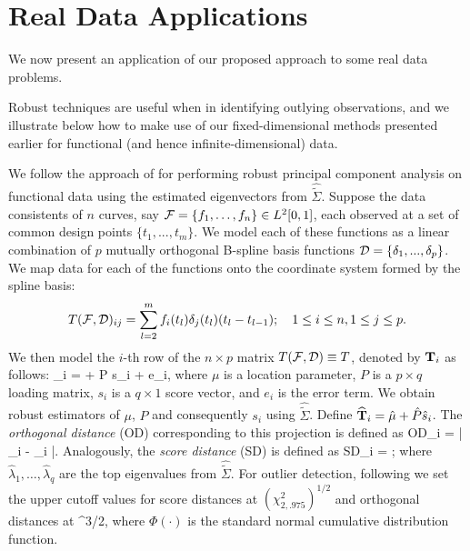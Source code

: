 \section{Real Data Applications}
\label{Sec:DA}

We  now present an application of our proposed approach to some real data problems. 

Robust techniques are useful when in identifying outlying observations, and we illustrate 
below how to make use of our fixed-dimensional methods presented earlier for 
functional (and hence infinite-dimensional)  data. 

We follow the approach of \cite{ref:JASA151100_BoenteSalibianBarrera} 
for performing robust principal component 
analysis on functional data using the estimated eigenvectors from 
$\widehat{\tilde{\Sigma}}$. Suppose the data consistents of  $n$ curves, say 
$ \mathcal{F} = \{ f_1, \ldots , f_n  \} \in L^2[0,1]$, each observed at a set of common design 
points $\{ t_1, ..., t_m \} $. We model each of these functions as a linear combination of 
$p$ mutually orthogonal B-spline basis functions $\mathcal{D} = \{ \delta_1, ..., \delta_p \}$. We map data for each of the functions onto the coordinate system formed by the spline basis:
%
\begin{equation}
T( \cF, \cD)_{ij} = \sum_{l=2}^m f_i(t_l) \delta_j(t_l) (t_l - t_{l-1}); \quad 1 \leq i \leq n, 1 \leq j \leq p.
\end{equation}
%
We then model  the $i$-th row of the $n \times p$ matrix $T(\mathcal{F}, \mathcal{D}) \equiv T$, 
denoted by ${\mathbf{T}}_{i}$ 
as follows:
\ban 
\bfT_i = \mu + P s_i + e_{i},
\ean
where $\mu$ is a location parameter, $P$ is a $p \times q$ loading matrix, $s_{i}$ is 
a $q \times 1$ score vector, and $e_{i}$ is the error term. We obtain robust estimators of 
$\mu$, $P$ and consequently $s_{i}$ using $\widehat{\tilde{\Sigma}}$. Define 
$\widehat{{\mathbf{T}}}_{i} = \hat{\mu} + \hat{P} \hat{s}_{i}$. 
The \textit{orthogonal distance} (OD)  corresponding to this projection is defined as 
\ban 
OD_{i} = | \bfT_i - \widehat{\bfT}_{i} |.
\ean
Analogously, the \textit{score distance} (SD) is defined as 
\ban 
SD_i = ; 
\ean
where $\hat \lambda_1,\ldots ,\hat \lambda_q$ are the top eigenvalues from 
$\widehat{\tilde{\Sigma}}$. 
For outlier detection, following \cite{ref:Technometrics0564_Hubertetal} 
we set the upper cutoff values for 
score distances at $(\chi^2_{2, .975})^{1/2}$ and orthogonal distances at 
^{3/2},
\ean
 where 
$\Phi(\cdot)$ is the standard normal cumulative distribution function.

